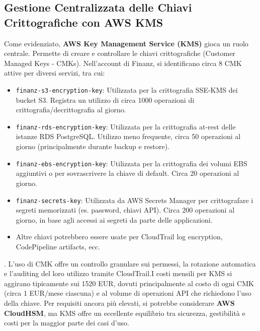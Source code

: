 \subsection{Gestione Centralizzata delle Chiavi Crittografiche con AWS KMS}
\label{subsec:kms_cap2}
Come evidenziato, \textbf{AWS Key Management Service (KMS)} gioca un ruolo centrale. Permette di creare e controllare le chiavi crittografiche (Customer Managed Keys - CMKs). Nell'account di Finanz, si identificano circa 8 CMK attive per diversi servizi, tra cui: \begin{itemize}
    \item \texttt{finanz-s3-encryption-key}: Utilizzata per la crittografia SSE-KMS dei bucket S3. Registra un utilizzo di circa 1000 operazioni di crittografia/decrittografia al giorno.
    \item \texttt{finanz-rds-encryption-key}: Utilizzata per la crittografia at-rest delle istanze RDS PostgreSQL. Utilizzo meno frequente, circa 50 operazioni al giorno (principalmente durante backup e restore).
    \item \texttt{finanz-ebs-encryption-key}: Utilizzata per la crittografia dei volumi EBS aggiuntivi o per sovrascrivere la chiave di default. Circa 20 operazioni al giorno.
    \item \texttt{finanz-secrets-key}: Utilizzata da AWS Secrets Manager per crittografare i segreti memorizzati (es. password, chiavi API). Circa 200 operazioni al giorno, in base agli accessi ai segreti da parte delle applicazioni.
    \item Altre chiavi potrebbero essere usate per CloudTrail log encryption, CodePipeline artifacts, ecc.
\end{itemize}. 
L'uso di CMK offre un controllo granulare sui permessi, la rotazione automatica e l'auditing del loro utilizzo tramite CloudTrail.I costi mensili per KMS si aggirano tipicamente sui 15\discretionary{-}{}{-}20 EUR, dovuti principalmente al costo di ogni CMK (circa 1 EUR/mese ciascuna) e al volume di operazioni API che richiedono l'uso della chiave. Per requisiti ancora più elevati, si potrebbe considerare \textbf{AWS CloudHSM}, ma KMS offre un eccellente equilibrio tra sicurezza, gestibilità e costi per la maggior parte dei casi d'uso.

